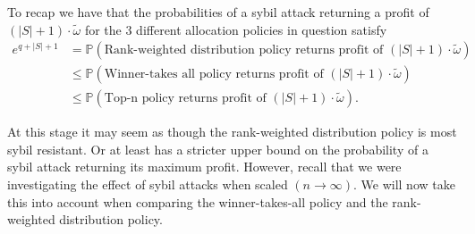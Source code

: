 \noindent{}To recap we have that the probabilities of a sybil attack returning a profit of $\left(|S|+1\right)\cdot{}\tilde{\omega}$ for the 3 different allocation policies in question satisfy
\begin{align*}
e^{q+|S|+1} &= \mathbb{P}\left(\textrm{Rank-weighted distribution policy returns profit of } (|S|+1)\cdot\tilde{\omega}\right) \\ & \leq \mathbb{P}\left(\textrm{Winner-takes all policy returns profit of }(|S|+1)\cdot\tilde{\omega}\right) \\ & \leq \mathbb{P}\left(\textrm{Top-n policy returns profit of }(|S|+1)\cdot\tilde{\omega}\right).
\end{align*}


\noindent{}At this stage it may seem as though the rank-weighted distribution policy is most sybil resistant. Or at least has a stricter upper bound on the probability of a sybil attack returning its maximum profit. However, recall that we were investigating the effect of sybil attacks when scaled $(n\rightarrow\infty)$. We will now take this into account when comparing the winner-takes-all policy and the rank-weighted distribution policy. \vspace{1em}\\

